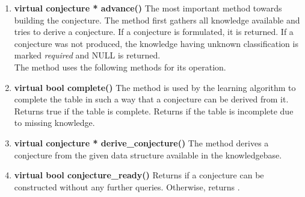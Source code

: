 \begin{enumerate}
 \item \textbf{virtual conjecture * advance()} \vskip 1pt
	The most important method towards building the conjecture. The method first gathers all knowledge available and tries to derive a conjecture. If a conjecture is formulated, it is returned. If a conjecture was not produced, the knowledge having unknown classification is marked \emph{required} and NULL is returned. \\
	The method uses the following methods for its operation.

 \item \textbf{virtual bool complete()} \vskip 1pt
	The method is used by the learning algorithm to complete the table in such a way that a conjecture can be derived from it. Returns true if the table is complete. Returns \false if the table is incomplete due to missing knowledge. 

 \item \textbf{virtual conjecture * derive\_conjecture()} \vskip 1pt
	The method derives a conjecture from the given data structure available in the knowledgebase. 

 \item \textbf{virtual bool conjecture\_ready()} \vskip 1pt
	Returns \true if a conjecture can be constructed without any further queries. Otherwise, returns \false.
\end{enumerate}






